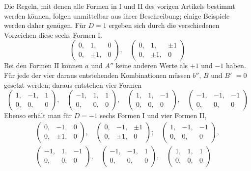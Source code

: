 Die Regeln, mit denen alle Formen in I und II des vorigen Artikels bestimmt werden können, folgen unmittelbar aus ihrer Beschreibung; einige Beispiele werden daher genügen. Für \(D=1\) ergeben sich durch die verschiedenen Vorzeichen diese sechs Formen I.
\[
\left(\begin{smallmatrix}0,&1,&0\\0,&\pm1,&0\end{smallmatrix}\right),\quad
\left(\begin{smallmatrix}0,&1,&\pm1\\0,&\pm1,&0\end{smallmatrix}\right)
\]
Bei den Formen II können \(a\) und \(A''\) keine anderen Werte als \(+1\) und \(-1\) haben. Für jede der vier daraus entstehenden Kombinationen müssen \(b''\), \(B\) und \(B'\) \(=0\) gesetzt werden; daraus entstehen vier Formen
\[
\left(\begin{smallmatrix}1,&-1,&1\\0,&0,&0\end{smallmatrix}\right),\quad
\left(\begin{smallmatrix}-1,&1,&1\\0,&0,&0\end{smallmatrix}\right),\quad
\left(\begin{smallmatrix}1,&1,&-1\\0,&0,&0\end{smallmatrix}\right),\quad
\left(\begin{smallmatrix}-1,&-1,&-1\\0,&0,&0\end{smallmatrix}\right)
\]
Ebenso erhält man für \(D=-1\) sechs Formen I und vier Formen II,
\[
\begin{gathered}
\left(\begin{smallmatrix}0,&-1,&0\\0,&\pm1,&0\end{smallmatrix}\right),\quad
\left(\begin{smallmatrix}0,&-1,&\pm1\\0,&\pm1,&0\end{smallmatrix}\right);\quad
\left(\begin{smallmatrix}1,&-1,&-1\\0,&0,&0\end{smallmatrix}\right),\\
\left(\begin{smallmatrix}-1,&1,&-1\\0,&0,&0\end{smallmatrix}\right),\quad
\left(\begin{smallmatrix}-1,&-1,&1\\0,&0,&0\end{smallmatrix}\right),\quad
\left(\begin{smallmatrix}1,&1,&1\\0,&0,&0\end{smallmatrix}\right)
\end{gathered}
\]
